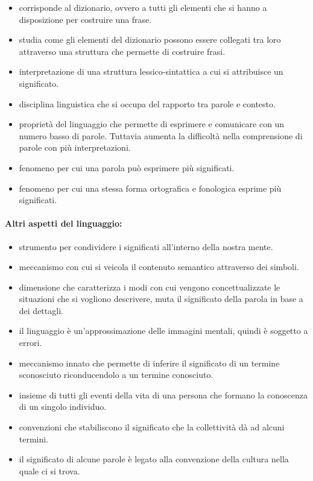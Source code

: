 \begin{itemize}
  \item {} corrisponde al dizionario, ovvero a tutti gli elementi che si hanno a disposizione per costruire una frase. 
  \item {} studia come gli elementi del dizionario possono essere collegati tra loro attraverso una struttura che permette di costruire frasi. 
  \item {} interpretazione di una struttura lessico-sintattica a cui si attribuisce un significato. 
  \item {} disciplina linguistica che si occupa del rapporto tra parole e contesto. 
  \item {} proprietà del linguaggio che permette di esprimere e comunicare con un numero basso di parole. Tuttavia aumenta la difficoltà nella comprensione di parole con più interpretazioni. 
  \item {} fenomeno per cui una parola può esprimere più significati. 
  \item {} fenomeno per cui una stessa forma ortografica e fonologica esprime più significati. 
\end{itemize}

\paragraph{Altri aspetti del linguaggio:}

\begin{itemize}
  \item {} strumento per condividere i significati all'interno della nostra mente. 
  \item {} meccanismo con cui si veicola il contenuto semantico attraverso dei simboli. 
  \item {} dimensione che caratterizza i modi con cui vengono concettualizzate le situazioni che si vogliono descrivere, muta il significato della parola in base a dei dettagli.
  \item {} il linguaggio è un'approssimazione delle immagini mentali, quindi è soggetto a errori.
  \item {} meccanismo innato che permette di inferire il significato di un termine sconosciuto riconducendolo a un termine conosciuto. 
  \item {} insieme di tutti gli eventi della vita di una persona che formano la conoscenza di un singolo individuo. 
  \item {} convenzioni che stabiliscono il significato che la collettività dà ad alcuni termini. 
  \item {} il significato di alcune parole è legato alla convenzione della cultura nella quale ci si trova.
\end{itemize}

